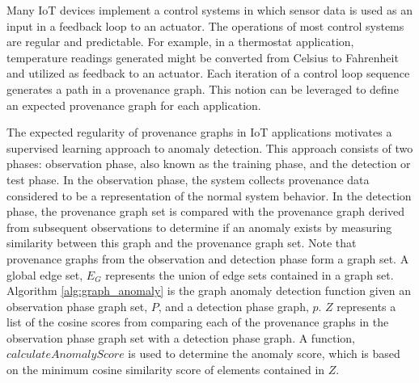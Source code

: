 \par Many IoT devices implement a control systems in which sensor data is used as an input in a feedback loop to an actuator. The operations of most control systems are regular and predictable. For example, in a thermostat application, temperature readings generated might be converted from Celsius to Fahrenheit and utilized as feedback to an actuator. Each iteration of a control loop sequence generates a path in a provenance graph. This notion can be leveraged to define an expected provenance graph for each application. 
\par The expected regularity of provenance graphs in IoT applications motivates a supervised learning approach to anomaly detection. This approach consists of two phases: observation phase, also known as the training phase, and the detection or test phase. In the observation phase, the system collects provenance data considered to be a representation of the normal system behavior. In the detection phase, the provenance graph set is compared with the provenance graph derived from subsequent observations to determine if an anomaly exists by measuring similarity between this graph and the provenance graph set. Note that provenance graphs from the observation and detection phase form a graph set. A global edge set, $E_G$ represents the union of edge sets contained in a graph set. Algorithm \ref{alg:graph_anomaly} is the graph anomaly detection function given an observation phase graph set, $P$, and a detection phase graph, $p$. $Z$ represents a list of the cosine scores from comparing each of the provenance graphs in the observation phase graph set with a detection phase graph. A  function, $calculateAnomalyScore$ is used to determine the anomaly score, which is based on the minimum cosine similarity score of elements contained in $Z$.

%
%







